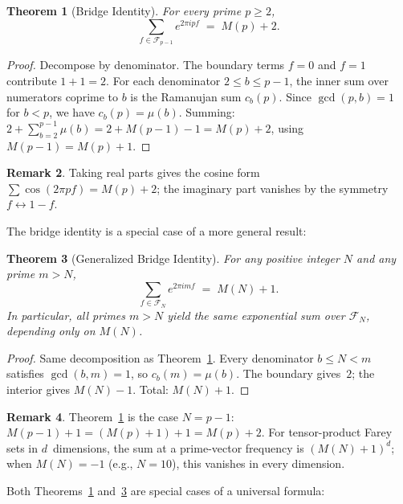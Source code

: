\documentclass[11pt]{article}
\newtheorem{theorem}{Theorem}[section]
\theoremstyle{definition}
\newtheorem{remark}[theorem]{Remark}
\newcommand{\F}{\mathcal{F}}
\begin{document}
\begin{theorem}[Bridge Identity]\label{thm:bridge}
For every prime $p \ge 2$,
\begin{equation}
  \sum_{f \in \F_{p-1}} e^{2\pi i p f}
  \;=\; M(p) + 2.
\end{equation}
\end{theorem}

\begin{proof}
Decompose by denominator.  The boundary terms $f = 0$ and $f = 1$
contribute $1 + 1 = 2$.  For each denominator $2 \le b \le p-1$,
the inner sum over numerators coprime to $b$ is the Ramanujan sum
$c_b(p)$.  Since $\gcd(p, b) = 1$ for $b < p$, we have
$c_b(p) = \mu(b)$.  Summing: $2 + \sum_{b=2}^{p-1} \mu(b) =
2 + M(p-1) - 1 = M(p) + 2$, using $M(p-1) = M(p) + 1$.
\end{proof}

\begin{remark}
Taking real parts gives the cosine form
$\sum \cos(2\pi pf) = M(p) + 2$;
the imaginary part vanishes by the symmetry $f \leftrightarrow 1 - f$.
\end{remark}

The bridge identity is a special case of a more general result:

\begin{theorem}[Generalized Bridge Identity]\label{thm:gen-bridge}
For any positive integer $N$ and any prime $m > N$,
\begin{equation}
  \sum_{f \in \F_N} e^{2\pi i m f} \;=\; M(N) + 1.
\end{equation}
In particular, all primes $m > N$ yield the \emph{same}
exponential sum over $\F_N$, depending only on $M(N)$.
\end{theorem}

\begin{proof}
Same decomposition as Theorem~\ref{thm:bridge}.  Every
denominator $b \le N < m$ satisfies $\gcd(b, m) = 1$,
so $c_b(m) = \mu(b)$.  The boundary gives~$2$; the
interior gives $M(N) - 1$.  Total: $M(N) + 1$.
\end{proof}

\begin{remark}
Theorem~\ref{thm:bridge} is the case $N = p - 1$:
$M(p-1) + 1 = (M(p) + 1) + 1 = M(p) + 2$.
For tensor-product Farey sets in $d$~dimensions, the sum
at a prime-vector frequency is $(M(N)+1)^d$; when $M(N) = -1$
(e.g., $N = 10$), this vanishes in every dimension.
\end{remark}

Both Theorems~\ref{thm:bridge} and~\ref{thm:gen-bridge} are
special cases of a universal formula:
\end{document}
